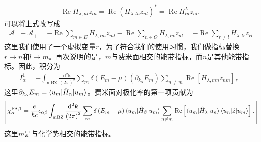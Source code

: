 \documentclass[10pt, oneside]{article}
\begin{document}
\begin{align}
	\operatorname{Re} H_{\lambda,nl} z_{ln} = \operatorname{Re} \left( H_{\lambda,ln} z_{nl} \right)^{*} = \operatorname{Re} H^{\lambda}_{ln} z_{nl},
\end{align}
可以将上式改写成
\begin{align}
	\mathcal{A}_{-} - \mathcal{A}_{+} = - \operatorname{Re} \sum_{m \in E}  H_{\lambda,lm} z_{ml} - \operatorname{Re} \sum_{n \in O } H_{\lambda, ln} z_{nl}  = - \operatorname{Re} \sum_{r \neq l} H_{\lambda, lr} z_{rl}
\end{align}
这里我们使用了一个虚拟变量\(r\)，为了符合我们的使用习惯，我们做指标替换\(r \rightarrow n\)和\(l \rightarrow m\)。再次说明的是，\(m\)与费米面相交的能带指标，而\(n\)是其他能带指标。因此，积分为
\begin{align}
	I^{1}_{\alpha} = - \int_{\mathrm{mBZ}} \frac{\mathrm{d}^{2} \bm{k}}{\left(2 \pi\right)^2} \sum_{m} \delta \left(E_{m} - \mu\right) \left(\partial_{k_{\alpha}} E_{m }\right) \sum_{n \neq m } \operatorname{Re} \left[H_{\lambda,mn} z_{nm}\right]，
\end{align}
这里\(\partial_{k_{\alpha}} E_{m } = \braket{u_{m } | \hat{H}_{\alpha} | u_{m}}\)。费米面对极化率的第一项贡献为
\begin{align}
	\boxed{
		\chi^{\mathrm{FS}, 1}_{\alpha} = \frac{e}{\hbar c} \epsilon_{\alpha \beta} \int_{\mathrm{mBZ}} \frac{\mathrm{d}^{2} \bm{k}}{\left(2 \pi\right)^2} \sum_{m} \delta \left(E_{m } - \mu\right) \braket{u_{m} | \hat{H}_{\beta} | u_{m}} \sum_{n \neq m} \operatorname{Re} \left[ \braket{u_{m} | \hat{H}_{\lambda} | u_{n }} \braket{u_{n} | \hat{z} | u_{m }}\right].
	}
\end{align}
这里\(m\)是与化学势相交的能带指标。

\vspace{1em}
\end{document}
